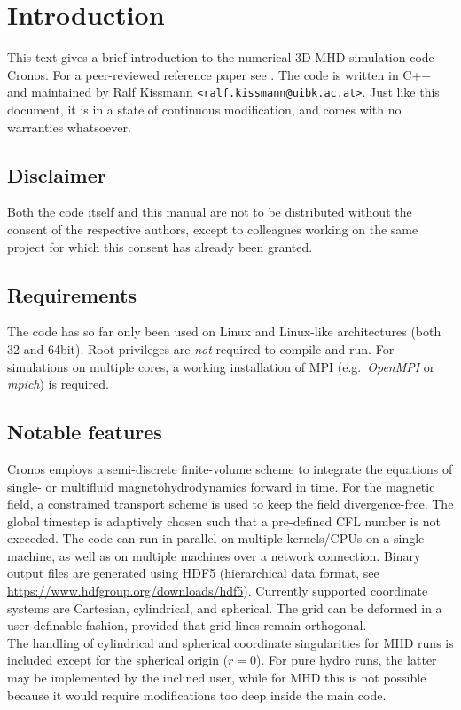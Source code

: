 \section{Introduction}

This text gives a brief introduction to the numerical 3D-MHD
simulation code {\sc Cronos}. For a peer-reviewed reference paper see
\citet{L:Kissmann_EA}.
The code is written in C++ and maintained by Ralf Kissmann
{\tt <ralf.kissmann@uibk.ac.at>}. Just like this document, it is in
a state of continuous modification, and comes with no warranties
whatsoever.

\subsection{Disclaimer}

Both the code itself and this manual are not to be distributed without
the consent of the respective authors, except to colleagues working on
the same project for which this consent has already been granted.

\subsection{Requirements}

The code has so far only been used on Linux and Linux-like
architectures (both 32 and 64bit). Root privileges are {\it not}
required to compile and run. For simulations on multiple cores, a
working installation of MPI (e.g.\ {\em OpenMPI} or {\em mpich}) is
required.

\subsection{Notable features}

{\sc Cronos} employs a semi-discrete finite-volume scheme to integrate
the equations of single- or multifluid magnetohydrodynamics forward in time.
For the magnetic field, a constrained transport scheme is used to keep the
field divergence-free. The global timestep is adaptively chosen such
that a pre-defined CFL number is not exceeded. The code can run in
parallel on multiple kernels/CPUs on a single machine, as well as on
multiple machines over a network connection. Binary output files are
generated using HDF5 (hierarchical data format, see
\url{https://www.hdfgroup.org/downloads/hdf5}). Currently supported coordinate systems are
Cartesian, cylindrical, and spherical. The grid can be deformed in
a user-definable fashion, provided that grid lines remain orthogonal. \\
The handling of cylindrical and spherical coordinate singularities for MHD
runs is included except for the spherical origin ($r=0$). For pure hydro runs,
the latter may be implemented by the inclined user, while for MHD this is not
possible because it would require modifications too deep inside the main code.


